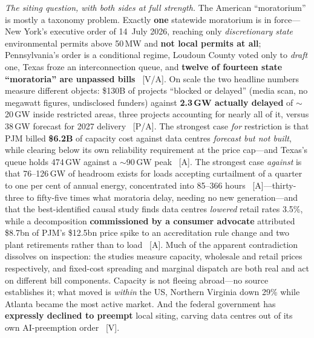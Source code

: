 \emph{The siting question, with both sides at full strength.} The American ``moratorium'' is mostly a taxonomy problem. Exactly \textbf{one} statewide moratorium is in force---New York's executive order of 14~July 2026, reaching only \emph{discretionary state} environmental permits above 50\,MW and \textbf{not local permits at all}; Pennsylvania's order is a conditional regime, Loudoun County voted only to \emph{draft} one, Texas froze an interconnection queue, and \textbf{twelve of fourteen state ``moratoria'' are unpassed bills}~\cite{moratorium-taxonomy} [V/A]. On scale the two headline numbers measure different objects: \$130B of projects ``blocked or delayed'' (media scan, no megawatt figures, undisclosed funders) against \textbf{2.3\,GW actually delayed} of $\sim$20\,GW inside restricted areas, three projects accounting for nearly all of it, versus 38\,GW forecast for 2027 delivery~\cite{moratorium-scale} [P/A]. The strongest case \emph{for} restriction is that PJM billed \textbf{\$6.2B} of capacity cost against data centres \emph{forecast but not built}, while clearing below its own reliability requirement at the price cap---and Texas's queue holds 474\,GW against a $\sim$90\,GW peak~\cite{moratorium-attribution} [A]. The strongest case \emph{against} is that 76--126\,GW of headroom exists for loads accepting curtailment of a quarter to one per cent of annual energy, concentrated into 85--366 hours~\cite{flexible-load-headroom} [A]---thirty-three to fifty-five times what moratoria delay, needing no new generation---and that the best-identified causal study finds data centres \emph{lowered} retail rates 3.5\%, while a decomposition \textbf{commissioned by a consumer advocate} attributed \$8.7bn of PJM's \$12.5bn price spike to an accreditation rule change and two plant retirements rather than to load~\cite{moratorium-attribution} [A]. Much of the apparent contradiction dissolves on inspection: the studies measure capacity, wholesale and retail prices respectively, and fixed-cost spreading and marginal dispatch are both real and act on different bill components. Capacity is not fleeing abroad---no source establishes it; what moved is \emph{within} the US, Northern Virginia down 29\% while Atlanta became the most active market. And the federal government has \textbf{expressly declined to preempt} local siting, carving data centres out of its own AI-preemption order~\cite{federal-nopreempt,us-capacity-not-fleeing} [V].

